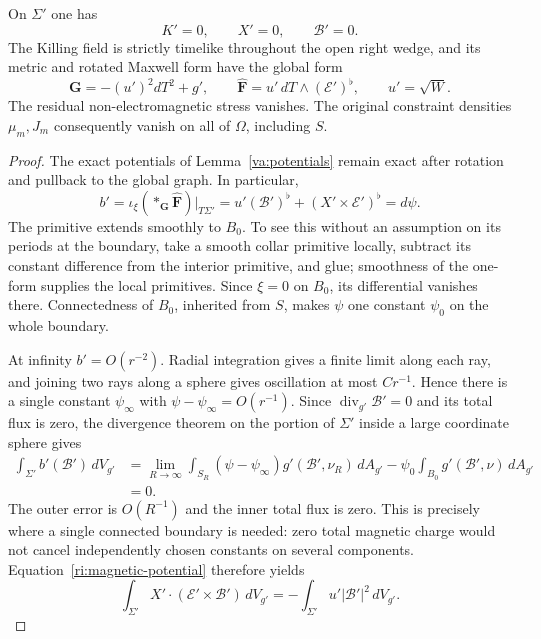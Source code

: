 \begin{proposition}
\label{ri:staticity}
On $\Sigma'$ one has
\[
 K'=0,\qquad X'=0,\qquad \mathcal B'=0.
\]
The Killing field is strictly timelike throughout the open right
wedge, and its metric and rotated Maxwell form have the global form
\begin{equation}
\label{ri:static-product}
 \mathbf G=-(u')^2dT^2+g',\qquad
 \widehat{\mathbf F}=u'\,dT\wedge(\mathcal E')^\flat,
 \qquad u'=\sqrt W.
\end{equation}
The residual non-electromagnetic stress vanishes.  The original
constraint densities $\mu_m,J_m$ consequently vanish on all of
$\Omega$, including $S$.
\end{proposition}

\begin{proof}
The exact potentials of Lemma~\ref{va:potentials} remain exact
after rotation and pullback to the global graph.  In particular,
\begin{equation}
\label{ri:magnetic-potential}
 b'=\iota_\xi(*_{\mathbf G}\widehat{\mathbf F})|_{T\Sigma'}
    =u'(\mathcal B')^\flat+(X'\times\mathcal E')^\flat=d\psi.
\end{equation}
The primitive extends smoothly to $B_0$.  To see this without an
assumption on its periods at the boundary, take a smooth collar
primitive locally, subtract its constant difference from the
interior primitive, and glue; smoothness of the one-form supplies
the local primitives.  Since $\xi=0$ on $B_0$, its differential
vanishes there.  Connectedness of $B_0$, inherited from $S$, makes
$\psi$ one constant $\psi_0$ on the whole boundary.

At infinity $b'=O(r^{-2})$.  Radial integration gives a finite
limit along each ray, and joining two rays along a sphere gives
oscillation at most $Cr^{-1}$.  Hence there is a single constant
$\psi_\infty$ with $\psi-\psi_\infty=O(r^{-1})$.
Since $\operatorname{div}_{g'}\mathcal B'=0$ and its total flux is
zero, the divergence theorem on the portion of $\Sigma'$ inside a
large coordinate sphere gives
\[
 \begin{split}
 \int_{\Sigma'}b'(\mathcal B')\,dV_{g'}
 &=\lim_{R\to\infty}\int_{S_R}
       (\psi-\psi_\infty)g'(\mathcal B',\nu_R)\,dA_{g'}
       -\psi_0\int_{B_0}g'(\mathcal B',\nu)\,dA_{g'}\\
 &=0.
 \end{split}
\]
The outer error is $O(R^{-1})$ and the inner total flux is zero.
This is precisely where a single connected boundary is needed:
zero total magnetic charge would not cancel independently chosen
constants on several components.  Equation~\eqref{ri:magnetic-potential}
therefore yields
\begin{equation}
\label{ri:magnetic-integral}
 \int_{\Sigma'}X'\cdot(\mathcal E'\times\mathcal B')\,dV_{g'}
       =-\int_{\Sigma'}u'|\mathcal B'|^2\,dV_{g'}.
\end{equation}


\end{proof}
